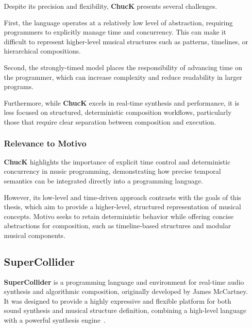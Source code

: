 Despite its precision and flexibility, \textbf{ChucK} presents several challenges.

First, the language operates at a relatively low level of abstraction, requiring programmers to explicitly manage time
and concurrency.
This can make it difficult to represent higher-level musical structures such as patterns, timelines, or hierarchical
compositions.

Second, the strongly-timed model places the responsibility of advancing time on the programmer, which can increase
complexity and reduce readability in larger programs.

Furthermore, while \textbf{ChucK} excels in real-time synthesis and performance, it is less focused on structured,
deterministic composition workflows, particularly those that require clear separation between composition and execution.


\subsubsection{Relevance to Motivo}

\textbf{ChucK} highlights the importance of explicit time control and deterministic concurrency in music programming,
demonstrating how precise temporal semantics can be integrated directly into a programming language.

However, its low-level and time-driven approach contrasts with the goals of this thesis, which aim to provide a
higher-level, structured representation of musical concepts.
Motivo seeks to retain deterministic behavior while offering concise abstractions for composition, such
as timeline-based structures and modular musical components.


\subsection{SuperCollider}\label{detail-subsec:supercollider}

\textbf{SuperCollider} is a programming language and environment for real-time audio synthesis and algorithmic
composition, originally developed by James McCartney.
It was designed to provide a highly expressive and flexible platform for both sound synthesis and musical structure
definition, combining a high-level language with a powerful synthesis engine~\cite{McCartney_2002}.

